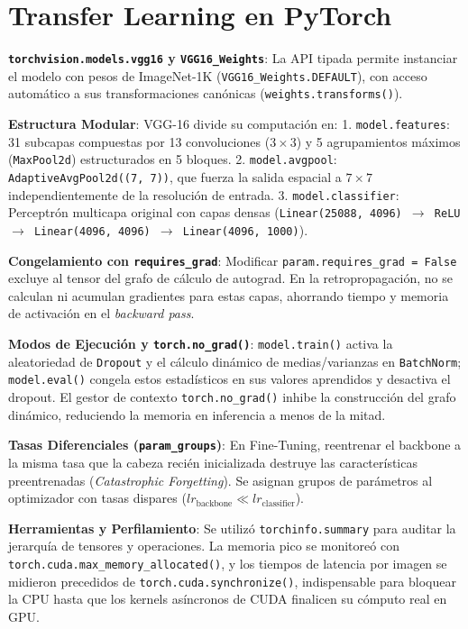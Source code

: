 \documentclass[10pt,twocolumn,a4paper]{article}
\begin{document}
\section{Transfer Learning en PyTorch}
\textbf{\texttt{torchvision.models.vgg16} y \texttt{VGG16\_Weights}}: La API tipada permite instanciar el modelo con pesos de ImageNet-1K (\texttt{VGG16\_Weights.DEFAULT}), con acceso automático a sus transformaciones canónicas (\texttt{weights.transforms()}).

\textbf{Estructura Modular}: VGG-16 divide su computación en:
1. \texttt{model.features}: 31 subcapas compuestas por 13 convoluciones ($3\times 3$) y 5 agrupamientos máximos (\texttt{MaxPool2d}) estructurados en 5 bloques.
2. \texttt{model.avgpool}: \texttt{AdaptiveAvgPool2d((7, 7))}, que fuerza la salida espacial a $7\times 7$ independientemente de la resolución de entrada.
3. \texttt{model.classifier}: Perceptrón multicapa original con capas densas (\texttt{Linear(25088, 4096) $\to$ ReLU $\to$ Linear(4096, 4096) $\to$ Linear(4096, 1000)}).

\textbf{Congelamiento con \texttt{requires\_grad}}: Modificar \texttt{param.requires\_grad = False} excluye al tensor del grafo de cálculo de autograd. En la retropropagación, no se calculan ni acumulan gradientes para estas capas, ahorrando tiempo y memoria de activación en el \textit{backward pass}.

\textbf{Modos de Ejecución y \texttt{torch.no\_grad()}}: \texttt{model.train()} activa la aleatoriedad de \texttt{Dropout} y el cálculo dinámico de medias/varianzas en \texttt{BatchNorm}; \texttt{model.eval()} congela estos estadísticos en sus valores aprendidos y desactiva el dropout. El gestor de contexto \texttt{torch.no\_grad()} inhibe la construcción del grafo dinámico, reduciendo la memoria en inferencia a menos de la mitad.

\textbf{Tasas Diferenciales (\texttt{param\_groups})}: En Fine-Tuning, reentrenar el backbone a la misma tasa que la cabeza recién inicializada destruye las características preentrenadas (\textit{Catastrophic Forgetting}). Se asignan grupos de parámetros al optimizador con tasas dispares ($lr_{\text{backbone}} \ll lr_{\text{classifier}}$).

\textbf{Herramientas y Perfilamiento}: Se utilizó \texttt{torchinfo.summary} para auditar la jerarquía de tensores y operaciones. La memoria pico se monitoreó con \texttt{torch.cuda.max\_memory\_allocated()}, y los tiempos de latencia por imagen se midieron precedidos de \texttt{torch.cuda.synchronize()}, indispensable para bloquear la CPU hasta que los kernels asíncronos de CUDA finalicen su cómputo real en GPU.
\end{document}
